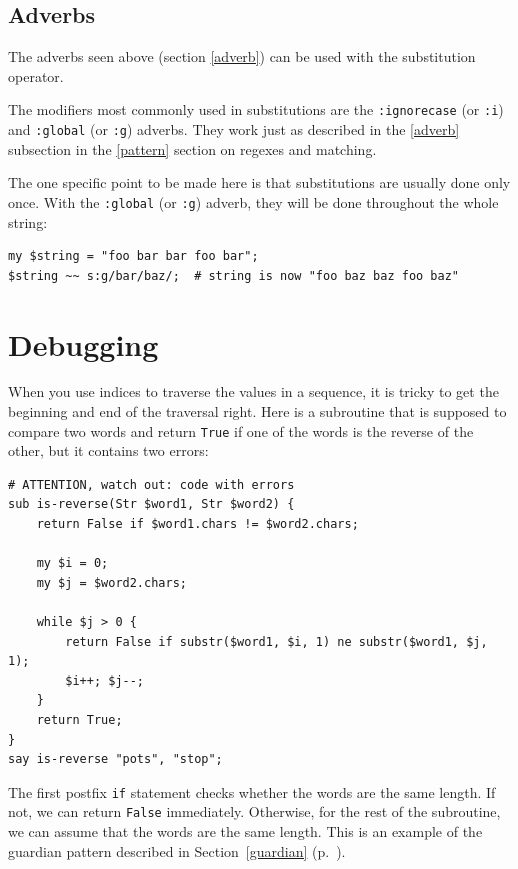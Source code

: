 \subsection{Adverbs}
\label{regex_adverbs}

The adverbs seen above (section \ref{adverb}) can be used 
with the substitution operator. 

The modifiers most commonly used in substitutions are the 
{\tt :ignorecase} (or {\tt :i}) and {\tt :global} (or 
{\tt :g}) adverbs. They work just as described in the 
\ref{adverb} subsection in the \ref{pattern} section on regexes 
and matching. 

The one specific point to be made here is that substitutions 
are usually done only once. With the {\tt :global} (or 
{\tt :g}) adverb, they will be done throughout the whole 
string:

\begin{verbatim}
my $string = "foo bar bar foo bar";
$string ~~ s:g/bar/baz/;  # string is now "foo baz baz foo baz"                    
\end{verbatim}
%


\section{Debugging}

When you use indices to traverse the values in a sequence,
it is tricky to get the beginning and end of the traversal
right.  Here is a subroutine that is supposed to compare two
words and return {\tt True} if one of the words is the reverse
of the other, but it contains two errors:

\begin{verbatim}
# ATTENTION, watch out: code with errors
sub is-reverse(Str $word1, Str $word2) {
    return False if $word1.chars != $word2.chars;
    
    my $i = 0;
    my $j = $word2.chars;

    while $j > 0 {
        return False if substr($word1, $i, 1) ne substr($word1, $j, 1);
        $i++; $j--;
    }
    return True;
}
say is-reverse "pots", "stop";

\end{verbatim}
%
The first postfix {\tt if} statement checks whether the words 
are the same length.  If not, we can return {\tt False} 
immediately. Otherwise, for the rest of the subroutine, 
we can assume that the words are the same length.  
This is an example of the guardian pattern described 
in Section~\ref{guardian} (p.~\pageref{guardian}).

